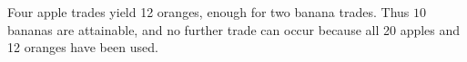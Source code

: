 Four apple trades yield 12 oranges, enough for two banana trades. Thus $\boxed{10}$ bananas are attainable, and no further trade can occur because all 20 apples and 12 oranges have been used.
